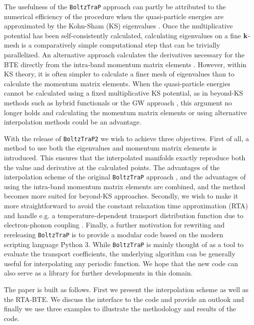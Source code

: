 \documentclass[final,5p,times,twocolumn,sort&compress]{elsarticle}
\begin{document}
The usefulness of the \texttt{BoltzTraP} approach can partly be attributed to the numerical efficiency of the procedure when the quasi-particle energies are approximated by the Kohn-Sham (KS) eigenvalues \cite{KS}. Once the multiplicative potential has been self-consistently calculated, calculating eigenvalues on a fine ${\bf k}$-mesh is a comparatively simple computational step that can be trivially parallelized. An alternative approach calculates the derivatives necessary for the BTE directly from the intra-band momentum matrix elements \cite{Scheidemantel_PRB03}. However, within KS theory, it is often simpler to calculate a finer mesh of eigenvalues than to calculate the momentum matrix elements. When the quasi-particle energies cannot be calculated using a fixed multiplicative KS potential, as in beyond-KS methods such as hybrid functionals \cite{b3} or the GW approach \cite{GW}, this argument no longer holds and calculating the momentum matrix elements \cite{Scheidemantel_PRB03} or using alternative interpolation methods \cite{Prendergast_PRB09,Pizzi_CPC14,Berland_CMS17} could be an advantage.

With the release of \texttt{BoltzTraP2} we wish to achieve three objectives. First of all, a method to use both the eigenvalues and momentum matrix elements is introduced. This ensures that the interpolated manifolds exactly reproduce both the value and derivative at the calculated points. The advantages of the interpolation scheme of the original \texttt{BoltzTraP} approach \cite{BoltzTraP}, and the advantages of using the intra-band momentum matrix elements \cite{Scheidemantel_PRB03} are combined, and the method becomes more suited for beyond-KS approaches. Secondly, we wish to make it more straightforward to avoid the constant relaxation time approximation (RTA) and handle e.g. a temperature-dependent transport distribution function due to electron-phonon coupling \cite{Xu_PRL14,Li_PRB15}. Finally, a further motivation for rewriting and rereleasing \texttt{BoltzTraP} is to provide a modular code based on the modern scripting language Python 3. While \texttt{BoltzTraP} is mainly thought of as a tool to evaluate the transport coefficients, the underlying algorithm can be generally useful for interpolating any periodic function. We hope that the new code can also serve as a library for further developments in this domain.

The paper is built as follows. First we present the interpolation scheme as well as the RTA-BTE. We discuss the interface to the code and provide an outlook and finally we use three examples to illustrate the methodology and results of the code. 
\end{document}
